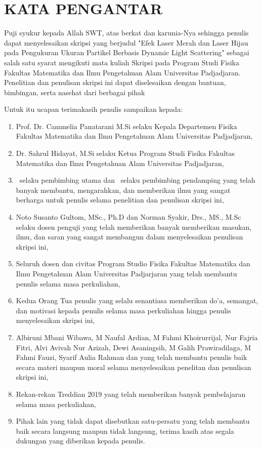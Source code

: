 \chapter*{\centering KATA PENGANTAR}

Puji syukur kepada Allah SWT, atas berkat dan karunia-Nya sehingga penulis dapat menyelesaikan
skripsi yang berjudul "Efek Laser Merah dan Laser Hijau pada Pengukuran Ukuran Partikel Berbasis
Dynamic Light Scattering" sebagai salah satu syarat mengikuti mata kuliah Skripsi pada Program
Studi Fisika Fakultas Matematika dan Ilmu Pengetahuan Alam Universitas Padjadjaran. Penelitian
dan penulisan skripsi ini dapat diselesaikan dengan bantuan, bimbingan, serta nasehat dari
berbagai pihak

Untuk itu ucapan terimakasih penulis sampaikan kepada: 

\begin{enumerate}
	\item Prof. Dr. Cammelia Panatarani M.Si selaku Kepala Departemen Fisika
Fakultas Matematika dan Ilmu Pengetahuan Alam Universitas Padjadjaran,
	\item Dr. Sahrul Hidayat, M.Si selaku Ketua Program Studi Fisika Fakultas
Matematika dan Ilmu Pengetahuan Alam Universitas Padjadjaran,
	\item \supervisorNameF ~selaku pembimbing utama dan \supervisorNameS ~selaku
pembimbing pendamping yang telah banyak membantu, mengarahkan, dan memberikan ilmu
yang sangat berharga untuk penulis selama penelitian dan penulisan skripsi ini,
	\item Noto Susanto Gultom, MSc., Ph.D dan Norman Syakir, Drs., MS., M.Sc selaku
dosen penguji yang telah memberikan banyak memberikan masukan, ilmu, dan saran yang
sangat membangun dalam menyelesaikan penulisan skripsi ini,
	\item Seluruh dosen dan civitas Program Studio Fisika Fakultas Matematika dan
Ilmu Pengetahuan Alam Universitas Padjarjaran yang telah membantu penulis selama masa
perkuliahan,
	\item Kedua Orang Tua penulis yang selalu senantiasa memberikan do'a, semangat,
dan motivasi kepada penulis selama masa perkuliahan hingga penulis menyelesaikan skripsi
ini,
	\item Albiruni Mbani Wibawa, M Naufal Ardian, M Fahmi Khoirurrijal, Nur Fajria Fitri,
Alvi Avivah Nur Azizah, Dewi Asaningsih, M Galih Prawiradilaga, M Fahmi Fauzi, Syarif Aulia
Rahman dan  yang telah membantu penulis baik secara materi maupun moral selama menyelesaikan
penelitan dan penulisan skripsi ini,
	\item Rekan-rekan Treddian 2019 yang telah memberikan banyak pembelajaran selama 
masa perkuliahan,
	\item Pihak lain yang tidak dapat disebutkan satu-persatu yang telah membantu baik secara langsung maupun tidak langsung, terima kasih atas segala dukungan yang diberikan kepada penulis.
\end{enumerate}

